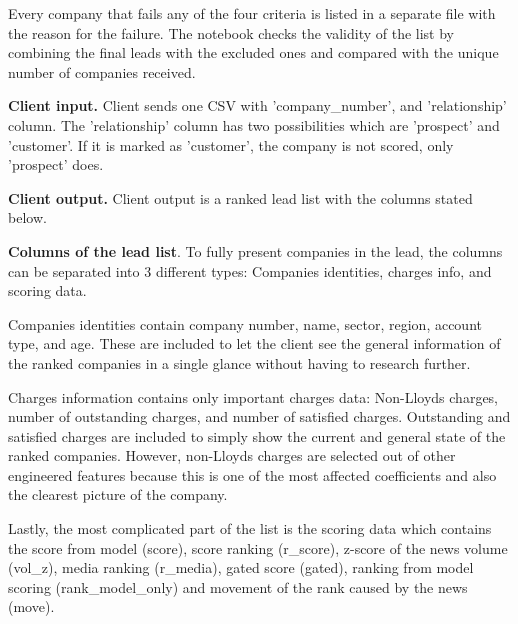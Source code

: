 \documentclass[ %
                    author={Natchalin Iwsakul \\[0.4em] Inkaphol Siriwongwattana \\[0.4em] Tanaphan Kummaraphat \\[0.6em] Patorn Srisupap},,
                supervisor={Fernando Moreno-Pino},
                    degree={MSc},
                     title={Propensity Modelling for SME Commercial Lending Using Open Public Data
},
                  subtitle={Companies House and GDELT as predictors of first-time borrowing},
                      type={},
                      year={2026}]{dissertation}
\begin{document}
Every company that fails any of the four criteria is listed in a separate file with the reason for the failure. The notebook checks the validity of the list by combining the final leads with the excluded ones and compared with the unique number of companies received.

\textbf{Client input.} Client sends one CSV with 'company\_number', and 'relationship' column. The 'relationship' column has two possibilities which are 'prospect' and 'customer'. If it is marked as 'customer', the company is not scored, only 'prospect' does. 

\textbf{Client output.} Client output is a ranked lead list with the columns stated below.

\textbf{Columns of the lead list}. 
To fully present companies in the lead, the columns can be separated into 3 different types: Companies identities, charges info, and scoring data. 

Companies identities contain company number, name, sector, region, account type, and age. These are included to let the client see the general information of the ranked companies in a single glance without having to research further.

Charges information contains only important charges data: Non-Lloyds charges, number of outstanding charges, and number of satisfied charges. Outstanding and satisfied charges are included to simply show the current and general state of the ranked companies. However, non-Lloyds charges are selected out of other engineered features because this is one of the most affected coefficients and also the clearest picture of the company.

Lastly, the most complicated part of the list is the scoring data which contains the score from model (score), score ranking (r\_score), z-score of the news volume (vol\_z), media ranking (r\_media), gated score (gated), ranking from model scoring (rank\_model\_only) and movement of the rank caused by the news (move).
\end{document}
